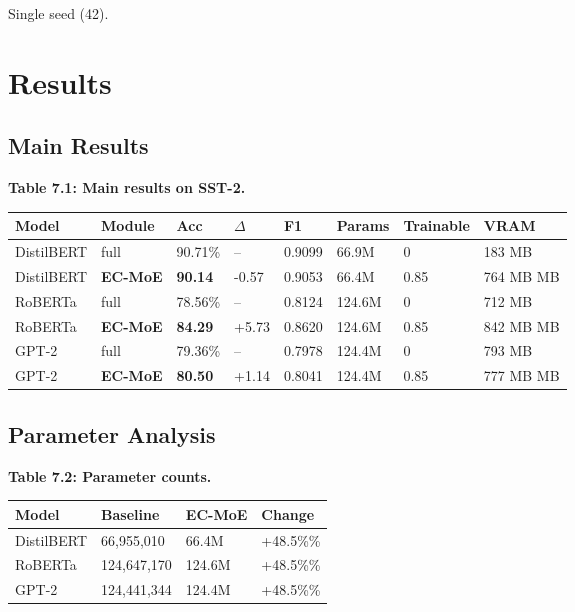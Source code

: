 Single seed (42).



\section{Results}

\subsection{Main Results}

\textbf{Table 7.1: Main results on SST-2.}

\begin{table}[H]
\centering
\small
\begin{tabular}{llllllll}
\toprule
\textbf{Model} & \textbf{Module} & \textbf{Acc} & \textbf{$\Delta$} & \textbf{F1} & \textbf{Params} & \textbf{Trainable} & \textbf{VRAM} \\
\midrule
DistilBERT & full & 90.71\% & -- & 0.9099 & 66.9M & 0 & 183 MB \\
DistilBERT & \textbf{EC-MoE} & \textbf{90.14} & -0.57 & 0.9053 & 66.4M & 0.85 & 764 MB MB \\
RoBERTa & full & 78.56\% & -- & 0.8124 & 124.6M & 0 & 712 MB \\
RoBERTa & \textbf{EC-MoE} & \textbf{84.29} & +5.73 & 0.8620 & 124.6M & 0.85 & 842 MB MB \\
GPT-2 & full & 79.36\% & -- & 0.7978 & 124.4M & 0 & 793 MB \\
GPT-2 & \textbf{EC-MoE} & \textbf{80.50} & +1.14 & 0.8041 & 124.4M & 0.85 & 777 MB MB \\
\bottomrule
\end{tabular}
\end{table}

\subsection{Parameter Analysis}

\textbf{Table 7.2: Parameter counts.}

\begin{table}[H]
\centering
\small
\begin{tabular}{llll}
\toprule
\textbf{Model} & \textbf{Baseline} & \textbf{EC-MoE} & \textbf{Change} \\
\midrule
DistilBERT & 66,955,010 & 66.4M & +48.5\%\% \\
RoBERTa & 124,647,170 & 124.6M & +48.5\%\% \\
GPT-2 & 124,441,344 & 124.4M & +48.5\%\% \\
\bottomrule
\end{tabular}
\end{table}

